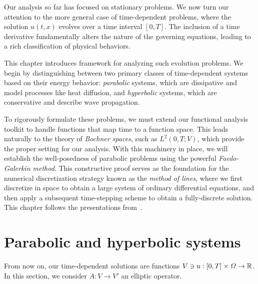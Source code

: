 Our analysis so far has focused on stationary problems. We now turn our attention to the more general case of time-dependent problems, where the solution $u(t,x)$ evolves over a time interval $[0,T]$. The inclusion of a time derivative fundamentally alters the nature of the governing equations, leading to a rich classification of physical behaviors. 

This chapter introduces framework for analyzing such evolution problems. We begin by distinguishing between two primary classes of time-dependent systems based on their energy behavior: \emph{parabolic} systems, which are dissipative and model processes like heat diffusion, and \emph{hyperbolic} systems, which are conservative and describe wave propagation.

To rigorously formulate these problems, we must extend our functional analysis toolkit to handle functions that map time to a function space. This leads naturally to the theory of \emph{Bochner spaces}, such as $L^2(0,T;V)$, which provide the proper setting for our analysis. With this machinery in place, we will establish the well-posedness of parabolic problems using the powerful \emph{Faedo-Galerkin method}. This constructive proof serves as the foundation for the numerical discretization strategy known as the \emph{method of lines}, where we first discretize in space to obtain a large system of ordinary differential equations, and then apply a subsequent time-stepping scheme to obtain a fully-discrete solution. This chapter follows the presentations from~\cite{thomee2007galerkin,quarteroni2008numerical}.

\section{Parabolic and hyperbolic systems}\label{sec:parabolic-hyperbolic-systems}
From now on, our time-dependent solutions are functions $V\ni u:[0,T]\times \Omega\to \mathbb{R}$. In this section, we consider $A:V\to V'$ an elliptic operator.

